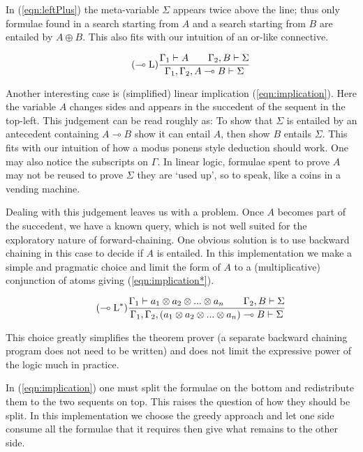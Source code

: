\documentclass[]{article}
\newcommand{\refp}[1]{(\ref{#1})}
\begin{document}
In \refp{eqn:leftPlus} the meta-variable $\Sigma$ appears twice above the
line; thus only formulae found in a search starting from $A$ and a search
starting from $B$ are entailed by $A \oplus B$. This also fits with our
intuition of an or-like connective.

\begin{equation}\label{eqn:implication}\tag{$\multimap\text{L}$}
    \frac{\Gamma_1 \vdash A   \qquad   \Gamma_2, B \vdash \Sigma}
         {\Gamma_1, \Gamma_2, A \multimap B \vdash \Sigma}
\end{equation}

Another interesting case is (simplified) linear implication
\refp{eqn:implication}. Here the variable $A$ changes sides and appears in the
succedent of the sequent in the top-left. This judgement can be read roughly
as: To show that $\Sigma$ is entailed by an antecedent containing $A \multimap
B$ show it can entail $A$, then show $B$ entails $\Sigma$. This fits with our
intuition of how a modus ponens style deduction should work. One may also
notice the subscripts on $\Gamma$. In linear logic, formulae spent to prove
$A$ may not be reused to prove $\Sigma$ they are `used up', so to speak, like
a coins in a vending machine.

Dealing with this judgement leaves us with a problem. Once $A$ becomes part of
the succedent, we have a known query, which is not well suited for the
exploratory nature of forward-chaining. One obvious solution is to use
backward chaining in this case to decide if $A$ is entailed. In this
implementation we make a simple and pragmatic choice and limit the form of $A$
to a (multiplicative) conjunction of atoms giving \refp{eqn:implication*}.

\begin{equation}\label{eqn:implication*}\tag{$\multimap\text{L}^*$}
    \frac{\Gamma_1 \vdash a_1 \otimes a_2 \otimes ... \otimes a_n
            \qquad
          \Gamma_2, B \vdash \Sigma}
         {\Gamma_1, \Gamma_2, (a_1 \otimes a_2 \otimes ... \otimes a_n)
            \multimap B \vdash \Sigma}
\end{equation}

This choice greatly simplifies the theorem prover (a separate backward
chaining program does not need to be written) and does not limit the
expressive power of the logic much in practice.

In \refp{eqn:implication} one must split the formulae on the bottom
and redistribute them to the two sequents on top. This raises the
question of how they should be split. In this implementation we
choose the greedy approach and let one side consume all the formulae
that it requires then give what remains to the other side.
\end{document}

